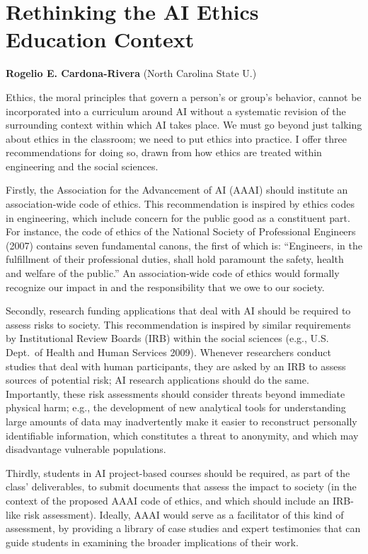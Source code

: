 \documentclass[letterpaper]{article}
\begin{document}
\section{Rethinking the AI Ethics Education Context}
\begin{center}
{\bf Rogelio E. Cardona-Rivera} (North Carolina State U.)
\end{center}

Ethics, the moral principles that govern a person's or group's behavior, cannot be incorporated into a curriculum around AI without a systematic revision of the surrounding context within which AI takes place. We must go beyond just talking about ethics in the classroom; we need to put ethics into practice. I offer three recommendations for doing so, drawn from how ethics are treated within engineering and the social sciences. 

Firstly, the Association for the Advancement of AI (AAAI) should institute an association-wide code of ethics. This recommendation is inspired by ethics codes in engineering, which include concern for the public good as a constituent part.  For instance, the code of ethics of the National Society of Professional Engineers (2007) contains seven fundamental canons, the first of which is: ``Engineers, in the fulfillment of their professional duties, shall hold paramount the safety, health and welfare of the public.'' An association-wide code of ethics would formally recognize our impact in and the responsibility that we owe to our society.

Secondly, research funding applications that deal with AI should be required to assess risks to society. This recommendation is inspired by similar requirements by Institutional Review Boards (IRB) within the social sciences (e.g., U.S. Dept.~of Health and Human Services 2009). Whenever researchers conduct studies that deal with human participants, they are asked by an IRB to assess sources of potential risk; AI research applications should do the same. Importantly, these risk assessments should consider threats beyond immediate physical harm; e.g., the development of new analytical tools for understanding large amounts of data may inadvertently make it easier to reconstruct personally identifiable information, which constitutes a threat to anonymity, and which may disadvantage vulnerable populations.

Thirdly, students in AI project-based courses should be required, as part of the class' deliverables, to submit documents that assess the impact to society (in the context of the proposed AAAI code of ethics, and which should include an IRB-like risk assessment). Ideally, AAAI would serve as a facilitator of this kind of assessment, by providing a library of case studies and expert testimonies that can guide students in examining the broader implications of their work.
\end{document}
